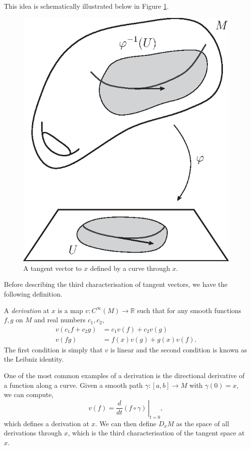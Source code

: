 \documentclass[12pt,a4paper]{article}
\begin{document}
This idea is schematically illustrated below in Figure \ref{fig:tang-1}. 

\begin{figure}[h!]
\centering
\includegraphics[scale=0.75]{fig/tang-3b}
\caption{A tangent vector to $x$ defined by a curve through $x$.}
\label{fig:tang-1}
\end{figure}

Before describing the third characterisation of tangent vectors, we have the following definition.
\begin{definition}
\label{def:derivation}
A \textit{derivation} at $x$ is a map $v:C^{\infty}(M)\to\mathbb{R}$ such that for any smooth functions $f,g$ on $M$ and real numbers $c_1,c_2$,
\begin{align*}
v(c_1f+c_2g)&=c_1v(f)+c_2v(g)\\
v(fg)&=f(x)v(g)+g(x)v(f).
\end{align*}
The first condition is simply that $v$ is linear and the second condition is known as the Leibniz identity.
\end{definition}
One of the most common examples of a derivation is the directional derivative of a function along a curve. Given a smooth path $\gamma:[a,b]\to M$ with $\gamma(0)=x$, we can compute,
\begin{equation}
v(f)=\left.\frac{d}{dt}(f\circ\gamma)\,\right\rvert_{t=0},
\label{eq:derivation-dirderiv}
\end{equation}
which defines a derivation at $x$. We can then define $D_xM$ as the space of all derivations through $x$, which is the third characterisation of the tangent space at $x$.
\end{document}
